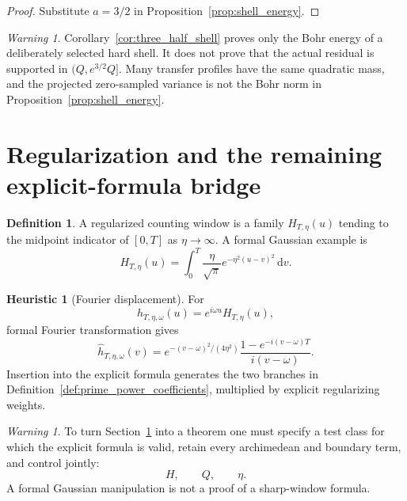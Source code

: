 \documentclass[11pt]{amsart}
\numberwithin{equation}{section}
\theoremstyle{plain}
\theoremstyle{definition}
\newtheorem{definition}[theorem]{Definition}
\newtheorem{heuristic}[theorem]{Heuristic}
\theoremstyle{remark}
\newtheorem{warning}[theorem]{Warning}
\newcommand{\1}{\mathbf{1}}
\newcommand{\dd}{\,\mathrm{d}}
\begin{document}
\begin{proof}
Substitute \(a=3/2\) in Proposition~\ref{prop:shell_energy}.
\end{proof}

\begin{warning}
\label{warn:no_shell_localization}
Corollary~\ref{cor:three_half_shell} proves only the Bohr energy of a
deliberately selected hard shell.  It does not prove that the actual
residual is supported in \((Q,e^{3/2}Q]\).  Many transfer profiles have
the same quadratic mass, and the projected zero-sampled variance is not
the Bohr norm in Proposition~\ref{prop:shell_energy}.
\end{warning}

\section{Regularization and the remaining explicit-formula bridge}
\label{sec:regularization_bridge}

\begin{definition}
\label{def:regularized_window}
A regularized counting window is a family
\(H_{T,\eta}(u)\) tending to the midpoint indicator of \([0,T]\) as
\(\eta\to\infty\).  A formal Gaussian example is
\begin{equation}
H_{T,\eta}(u)
=
\int_0^T
\frac{\eta}{\sqrt\pi}
e^{-\eta^2(u-v)^2}\dd v.
\label{eq:gaussian_window}
\end{equation}
\end{definition}

\begin{heuristic}[Fourier displacement]
\label{heur:gaussian_fourier}
For
\begin{equation}
h_{T,\eta,\omega}(u)
=
e^{i\omega u}H_{T,\eta}(u),
\label{eq:gaussian_test}
\end{equation}
formal Fourier transformation gives
\begin{equation}
\widehat h_{T,\eta,\omega}(v)
=
e^{-(v-\omega)^2/(4\eta^2)}
\frac{1-e^{-i(v-\omega)T}}{i(v-\omega)}.
\label{eq:gaussian_fourier}
\end{equation}
Insertion into the explicit formula generates the two branches in
Definition~\ref{def:prime_power_coefficients}, multiplied by explicit
regularizing weights.
\end{heuristic}

\begin{warning}
\label{warn:regularization_requirements}
To turn Section~\ref{sec:regularization_bridge} into a theorem one must
specify a test class for which the explicit formula is valid, retain every
archimedean and boundary term, and control jointly:
\begin{equation}
H,\qquad Q,\qquad\eta.
\label{eq:joint_parameters}
\end{equation}
A formal Gaussian manipulation is not a proof of a sharp-window formula.
\end{warning}
\end{document}
